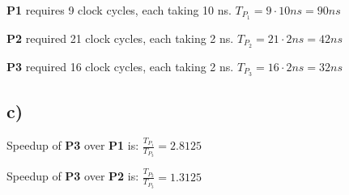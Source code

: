 \textbf{P1} requires 9 clock cycles, each taking 10 ns. $ T_{P_1} = 9 \cdot 10 \textit{ns} = 90 \textit{ns} $

\textbf{P2} required 21 clock cycles, each taking 2 ns. $ T_{P_2} = 21 \cdot 2 \textit{ns} = 42 \textit{ns} $

\textbf{P3} required 16 clock cycles, each taking 2 ns. $ T_{P_3} = 16 \cdot 2 \textit{ns} = 32 \textit{ns} $

\subsection*{\textbf{c)}}

Speedup of \textbf{P3} over \textbf{P1} is: $ \frac{T_{P_1}}{T_{P_3}} = 2.8125 $

Speedup of \textbf{P3} over \textbf{P2} is: $ \frac{T_{P_2}}{T_{P_3}} = 1.3125 $

\newpage
